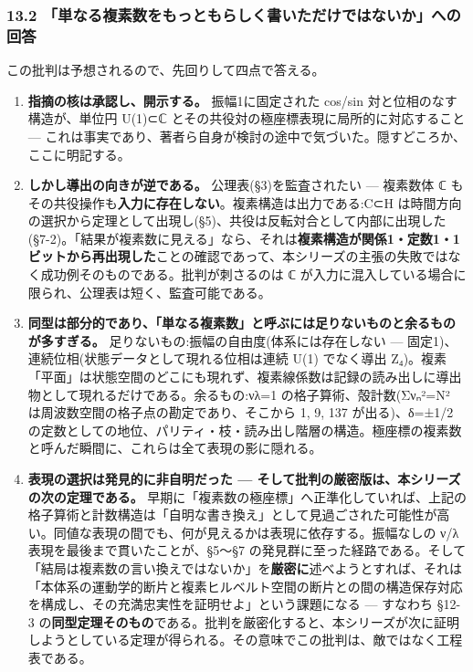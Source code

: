 \documentclass[
]{ltjsarticle}
\begin{document}
\subsubsection{13.2
「単なる複素数をもっともらしく書いただけではないか」への回答}\label{ux5358ux306aux308bux8907ux7d20ux6570ux3092ux3082ux3063ux3068ux3082ux3089ux3057ux304fux66f8ux3044ux305fux3060ux3051ux3067ux306fux306aux3044ux304bux3078ux306eux56deux7b54}

この批判は予想されるので、先回りして四点で答える。

\begin{enumerate}
\def\labelenumi{\arabic{enumi}.}
\item
  \textbf{指摘の核は承認し、開示する。} 振幅1に固定された cos/sin
  対と位相のなす構造が、単位円 U(1)⊂ℂ
  とその共役対の極座標表現に局所的に対応すること ---
  これは事実であり、著者ら自身が検討の途中で気づいた。隠すどころか、ここに明記する。
\item
  \textbf{しかし導出の向きが逆である。} 公理表(§3)を監査されたい ---
  複素数体 ℂ
  もその共役操作も\textbf{入力に存在しない}。複素構造は出力である:C⊂H
  は時間方向の選択から定理として出現し(§5)、共役は反転対合として内部に出現した(§7-2)。「結果が複素数に見える」なら、それは\textbf{複素構造が関係1・定数1・1ビットから再出現した}ことの確認であって、本シリーズの主張の失敗ではなく成功例そのものである。批判が刺さるのは
  ℂ が入力に混入している場合に限られ、公理表は短く、監査可能である。
\item
  \textbf{同型は部分的であり、「単なる複素数」と呼ぶには足りないものと余るものが多すぎる。}
  足りないもの:振幅の自由度(体系には存在しない ---
  固定1)、連続位相(状態データとして現れる位相は連続 U(1) でなく導出
  Z₄)。複素「平面」は状態空間のどこにも現れず、複素線係数は記録の読み出しに導出物として現れるだけである。余るもの:νλ=1
  の格子算術、殻計数(Σνₙ²=N² は周波数空間の格子点の勘定であり、そこから
  1, 9, 137 が出る)、δ=±1/2
  の定数としての地位、パリティ・枝・読み出し階層の構造。極座標の複素数と呼んだ瞬間に、これらは全て表現の影に隠れる。
\item
  \textbf{表現の選択は発見的に非自明だった ---
  そして批判の厳密版は、本シリーズの次の定理である。}
  早期に「複素数の極座標」へ正準化していれば、上記の格子算術と計数構造は「自明な書き換え」として見過ごされた可能性が高い。同値な表現の間でも、何が見えるかは表現に依存する。振幅なしの
  ν/λ 表現を最後まで貫いたことが、§5〜§7
  の発見群に至った経路である。そして「結局は複素数の言い換えではないか」を\textbf{厳密に}述べようとすれば、それは「本体系の運動学的断片と複素ヒルベルト空間の断片との間の構造保存対応を構成し、その充満忠実性を証明せよ」という課題になる
  --- すなわち §12-3
  の\textbf{同型定理そのもの}である。批判を厳密化すると、本シリーズが次に証明しようとしている定理が得られる。その意味でこの批判は、敵ではなく工程表である。
\end{enumerate}
\end{document}
